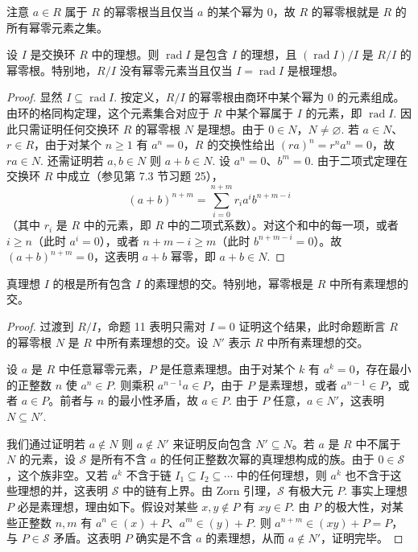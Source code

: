 注意 \(a \in R\) 属于 \(R\) 的幂零根当且仅当 \(a\) 的某个幂为 0，故 \(R\) 的幂零根就是 \(R\) 的所有幂零元素之集。

\begin{proposition}\label{pro:15.11}
设 \(I\) 是交换环 \(R\) 中的理想。则 \(\operatorname{rad}I\) 是包含 \(I\) 的理想，且 \((\operatorname{rad}I)/I\) 是 \(R/I\) 的幂零根。特别地，\(R/I\) 没有幂零元素当且仅当 \(I = \operatorname{rad}I\) 是根理想。
\end{proposition}

\begin{proof}
显然 \(I \subseteq \operatorname{rad}I\). 按定义，\(R/I\) 的幂零根由商环中某个幂为 0 的元素组成。由环的格同构定理，这个元素集合对应于 \(R\) 中某个幂属于 \(I\) 的元素，即 \(\operatorname{rad}I\). 因此只需证明任何交换环 \(R\) 的幂零根 \(N\) 是理想。由于 \(0 \in N\)，\(N \neq \varnothing\). 若 \(a \in N\)、\(r \in R\)，由于对某个 \(n \geq 1\) 有 \(a^n = 0\)，\(R\) 的交换性给出 \((ra)^n = r^na^n = 0\)，故 \(ra \in N\). 还需证明若 \(a, b \in N\) 则 \(a+b \in N\). 设 \(a^n = 0\)、\(b^m = 0\). 由于二项式定理在交换环 \(R\) 中成立（参见第 7.3 节习题 25），
\[
(a+b)^{n+m} = \sum_{i=0}^{n+m}r_ia^ib^{n+m-i}
\]
（其中 \(r_i\) 是 \(R\) 中的元素，即 \(R\) 中的二项式系数）。对这个和中的每一项，或者 \(i \geq n\)（此时 \(a^i = 0\)），或者 \(n+m-i \geq m\)（此时 \(b^{n+m-i} = 0\)）。故 \((a+b)^{n+m} = 0\)，这表明 \(a+b\) 幂零，即 \(a+b \in N\).
\end{proof}

\begin{proposition}\label{pro:15.12}
真理想 \(I\) 的根是所有包含 \(I\) 的素理想的交。特别地，幂零根是 \(R\) 中所有素理想的交。
\end{proposition}

\begin{proof}
过渡到 \(R/I\)，命题 11 表明只需对 \(I = 0\) 证明这个结果，此时命题断言 \(R\) 的幂零根 \(N\) 是 \(R\) 中所有素理想的交。设 \(N'\) 表示 \(R\) 中所有素理想的交。

设 \(a\) 是 \(R\) 中任意幂零元素，\(P\) 是任意素理想。由于对某个 \(k\) 有 \(a^k = 0\)，存在最小的正整数 \(n\) 使 \(a^n \in P\). 则乘积 \(a^{n-1}a \in P\)，由于 \(P\) 是素理想，或者 \(a^{n-1} \in P\)，或者 \(a \in P\)。前者与 \(n\) 的最小性矛盾，故 \(a \in P\). 由于 \(P\) 任意，\(a \in N'\)，这表明 \(N \subseteq N'\).

我们通过证明若 \(a \notin N\) 则 \(a \notin N'\) 来证明反向包含 \(N' \subseteq N\)。若 \(a\) 是 \(R\) 中不属于 \(N\) 的元素，设 \(\mathcal{S}\) 是所有不含 \(a\) 的任何正整数次幂的真理想构成的族。由于 \(0 \in \mathcal{S}\)，这个族非空。又若 \(a^k\) 不含于链 \(I_1 \subseteq I_2 \subseteq \cdots\) 中的任何理想，则 \(a^k\) 也不含于这些理想的并，这表明 \(\mathcal{S}\) 中的链有上界。由 Zorn 引理，\(\mathcal{S}\) 有极大元 \(P\). 事实上理想 \(P\) 必是素理想，理由如下。假设对某些 \(x, y \notin P\) 有 \(xy \in P\). 由 \(P\) 的极大性，对某些正整数 \(n, m\) 有 \(a^n \in (x)+P\)、\(a^m \in (y)+P\). 则 \(a^{n+m} \in (xy)+P = P\)，与 \(P \in \mathcal{S}\) 矛盾。这表明 \(P\) 确实是不含 \(a\) 的素理想，从而 \(a \notin N'\)，证明完毕。
\end{proof}

